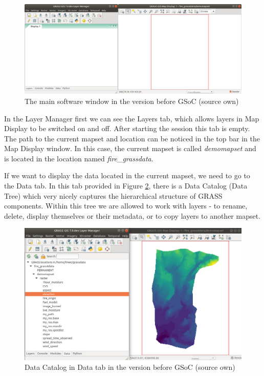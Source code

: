 \documentclass[a4paper,10pt,twoside]{article}
\begin{document}
\vspace{0.3cm}
\begin{figure}[hbt!] 
\begin{center}
\includegraphics[width=15cm]{../pictures/empty_layers1.png} 
\caption[The main software window (version before GSoC)]{The main software window in the version before GSoC (source own)}
\label{fig:empty_layers1}
\end{center}
\end{figure}

In the Layer Manager first we can see the Layers tab, which allows layers in Map Display to be switched on and off. After starting the session this tab is empty. The path to the current mapset and location can be noticed in the top bar in the Map Display window. In this case, the current mapset is called \textit{demomapset} and is located in the location named \textit{fire\_grassdata}. 

If we want to display the data located in the current mapset, we need to go to the Data tab. In this tab provided in Figure \ref{fig:data_catalog_pred}, there is a Data Catalog (Data Tree) which very nicely captures the hierarchical structure of GRASS components. Within this tree we are allowed to work with layers - to rename, delete, display themselves or their metadata, or to copy layers to another mapset.

\vspace{0.3cm}
\begin{figure}[hbt!] 
\begin{center}
\includegraphics[width=14cm]{../pictures/data_catalog_pred.png} 
\caption[Data Catalog in Data tab (version before GSoC)]{Data Catalog in Data tab in the version before GSoC (source own)}
\label{fig:data_catalog_pred}
\end{center}
\end{figure}
\end{document}
